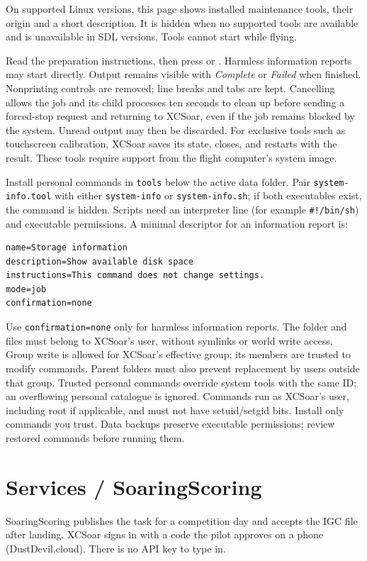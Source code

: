 On supported Linux versions, this page shows installed maintenance tools,
their origin and a short description.  It is hidden when no supported tools
are available and is unavailable in SDL versions.  Tools cannot start while
flying.

Read the preparation instructions, then press  or
.  Harmless information reports may start directly.
Output remains visible with \emph{Complete} or \emph{Failed} when finished.
Nonprinting controls are removed; line breaks and tabs are kept.
Cancelling allows the job and its child processes ten seconds to clean up
before sending a forced-stop request and returning to XCSoar, even if the
job remains blocked by the system.  Unread output may then be discarded.
For exclusive tools such as touchscreen
calibration, XCSoar saves its state, closes, and restarts with the result.
These tools require support from the flight computer's system image.

Install personal commands in \texttt{tools} below the active data folder.
Pair \texttt{system-info.tool} with either \texttt{system-info} or
\texttt{system-info.sh}; if both executables exist, the command is hidden.
Scripts need an interpreter line (for example \texttt{\#!/bin/sh}) and
executable permissions.  A minimal descriptor for an information report is:
\begin{verbatim}
name=Storage information
description=Show available disk space
instructions=This command does not change settings.
mode=job
confirmation=none
\end{verbatim}
Use \texttt{confirmation=none} only for harmless information reports.
The folder and files must belong to XCSoar's user, without symlinks or world
write access.  Group write is allowed for XCSoar's effective group; its
members are trusted to modify commands.  Parent folders must also prevent
replacement by users outside that group.  Trusted personal commands override
system tools with the same ID; an overflowing personal catalogue is ignored.
Commands run as XCSoar's user, including root if applicable, and must not
have setuid/setgid bits.  Install only commands you trust.  Data backups
preserve executable permissions; review restored commands before running them.


\section{Services / SoaringScoring}

SoaringScoring publishes the task for a competition day and accepts the
IGC file after landing. XCSoar signs in with a code the pilot approves
on a phone (DustDevil.cloud). There is no API key to type in.

